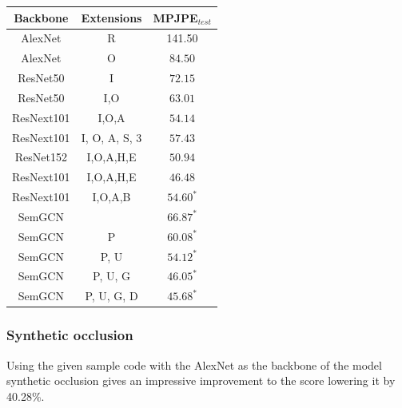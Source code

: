 \begin{table}[h!]
    \label{tab:ablation}
    \centering
    \begin{tabular}{|| c | c | c ||}
        \hline
        \textbf{Backbone} & \textbf{Extensions} & \textbf{MPJPE}$_{test}$ \\
        \hline\hline
        AlexNet           & R                   & 141.50                  \\
        \hline
        AlexNet           & O                   & $84.50$                 \\
        \hline
        ResNet50          & I                   & $72.15$                 \\
        \hline
        ResNet50          & I,O                 & $63.01$                 \\
        \hline
        ResNext101        & I,O,A               & $54.14$                 \\
        \hline
        ResNext101        & I, O, A, S, 3       & $57.43$                 \\
        \hline
        ResNet152         & I,O,A,H,E           & $50.94$                 \\
        \hline
        ResNext101        & I,O,A,H,E           & $46.48$                 \\
        \hline
        ResNext101        & I,O,A,B             & $54.60^*$               \\
        \hline
        \hline
        SemGCN            &                     & $66.87^*$               \\
        \hline
        SemGCN            & P                   & $60.08^*$               \\
        \hline
        SemGCN            & P, U                & $54.12^*$               \\
        \hline
        SemGCN            & P, U, G             & $46.05^*$               \\
        \hline
        SemGCN            & P, U, G, D          & $45.68^*$               \\
        \hline
    \end{tabular}
\end{table}

\subsubsection*{Synthetic occlusion}
Using the given sample code with the AlexNet as the backbone of the model synthetic occlusion
gives an impressive improvement to the score lowering it by 40.28\%.

